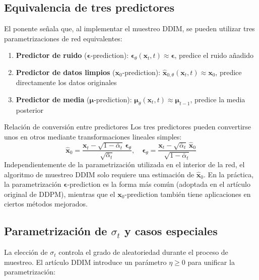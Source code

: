 \subsection{Equivalencia de tres predictores}

El ponente señala que, al implementar el muestreo DDIM, se pueden utilizar tres parametrizaciones de red equivalentes:

\begin{enumerate}
    \item \textbf{Predictor de ruido} ($\boldsymbol{\epsilon}$-prediction): $\boldsymbol{\epsilon}_\theta(\mathbf{x}_t, t) \approx \boldsymbol{\epsilon}$, predice el ruido añadido
    \item \textbf{Predictor de datos limpios} ($\mathbf{x}_0$-prediction): $\hat{\mathbf{x}}_{0,\theta}(\mathbf{x}_t, t) \approx \mathbf{x}_0$, predice directamente los datos originales
    \item \textbf{Predictor de media} ($\boldsymbol{\mu}$-prediction): $\boldsymbol{\mu}_\theta(\mathbf{x}_t, t) \approx \boldsymbol{\mu}_{t-1}$, predice la media posterior
\end{enumerate}

\begin{knowledgebox}{Relación de conversión entre predictores}
Los tres predictores pueden convertirse unos en otros mediante transformaciones lineales simples:
$$
\hat{\mathbf{x}}_0 = \frac{\mathbf{x}_t - \sqrt{1-\bar{\alpha}_t}\,\boldsymbol{\epsilon}_\theta}{\sqrt{\bar{\alpha}_t}}, \quad
\boldsymbol{\epsilon}_\theta = \frac{\mathbf{x}_t - \sqrt{\bar{\alpha}_t}\,\hat{\mathbf{x}}_0}{\sqrt{1-\bar{\alpha}_t}}
$$
Independientemente de la parametrización utilizada en el interior de la red, el algoritmo de muestreo DDIM solo requiere una estimación de $\hat{\mathbf{x}}_0$. En la práctica, la parametrización $\boldsymbol{\epsilon}$-prediction es la forma más común (adoptada en el artículo original de DDPM), mientras que el $\mathbf{x}_0$-prediction también tiene aplicaciones en ciertos métodos mejorados.
\end{knowledgebox}

\subsection{Parametrización de $\sigma_t$ y casos especiales}

La elección de $\sigma_t$ controla el grado de aleatoriedad durante el proceso de muestreo. El artículo DDIM introduce un parámetro $\eta \geq 0$ para unificar la parametrización:

